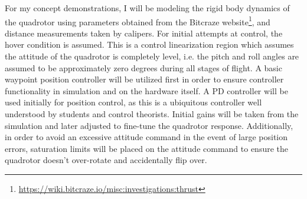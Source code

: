 \documentclass[onecolumn,10pt]{IEEEtran}
\begin{document}
For my concept demonstrations, I will be modeling the rigid body dynamics of the quadrotor using parameters obtained from the Bitcraze website\footnote{\url{https://wiki.bitcraze.io/misc:investigations:thrust}}, and distance measurements taken by calipers. For initial attempts at control, the hover condition is assumed. This is a control linearization region which assumes the attitude of the quadrotor is completely level, i.e. the pitch and roll angles are assumed to be approximately zero degrees during all stages of flight. A basic waypoint position controller will be utilized first in order to ensure controller functionality in simulation and on the hardware itself. A PD controller will be used initially for position control, as this is a ubiquitous controller well understood by students and control theorists. Initial gains will be taken from the simulation \cite{hartman2014quadcopter}
and later adjusted to fine-tune the quadrotor response. Additionally, in order to avoid an excessive attitude command in the event of large position errors, saturation limits will be placed on the attitude command to ensure the quadrotor doesn't over-rotate and accidentally flip over. 

\end{document}

